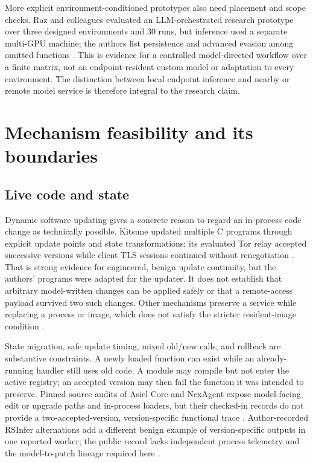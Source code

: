 \documentclass[11pt,letterpaper]{article}
\begin{document}
More explicit environment-conditioned prototypes also need placement and scope checks. Raz and colleagues evaluated an LLM-orchestrated research prototype over three designed environments and 30 runs, but inference used a separate multi-GPU machine; the authors list persistence and advanced evasion among omitted functions \cite{raz}. This is evidence for a controlled model-directed workflow over a finite matrix, not an endpoint-resident custom model or adaptation to every environment. The distinction between local endpoint inference and nearby or remote model service is therefore integral to the research claim.

\section{Mechanism feasibility and its boundaries}\label{sec:mechanism}

\subsection{Live code and state}

Dynamic software updating gives a concrete reason to regard an in-process code change as technically possible. Kitsune updated multiple C programs through explicit update points and state transformations; its evaluated Tor relay accepted successive versions while client TLS sessions continued without renegotiation \cite{kitsune}. That is strong evidence for engineered, benign update continuity, but the authors' programs were adapted for the updater. It does not establish that arbitrary model-written changes can be applied safely or that a remote-access payload survived two such changes. Other mechanisms preserve a service while replacing a process or image, which does not satisfy the stricter resident-image condition \cite{proteos}.

State migration, safe update timing, mixed old/new calls, and rollback are substantive constraints. A newly loaded function can exist while an already-running handler still uses old code. A module may compile but not enter the active registry; an accepted version may then fail the function it was intended to preserve. Pinned source audits of Asiel Core and NexAgent expose model-facing edit or upgrade paths and in-process loaders, but their checked-in records do not provide a two-accepted-version, version-specific functional trace \cite{asielapp,asielproposals,nexagent}. Author-recorded RSInfer alternations add a different benign example of version-specific outputs in one reported worker; the public record lacks independent process telemetry and the model-to-patch lineage required here \cite{rsinfer}.
\end{document}
